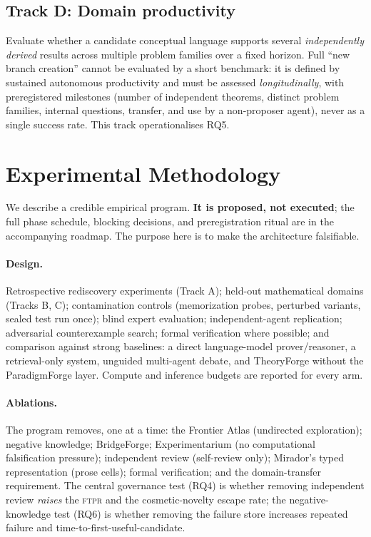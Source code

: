 \documentclass[11pt]{article}
\theoremstyle{definition}
\theoremstyle{remark}
\newcommand{\ftpr}{\textsc{ftpr}}
\newcommand{\PF}{ParadigmForge}
\begin{document}
\subsection{Track D: Domain productivity}
Evaluate whether a candidate conceptual language supports several \emph{independently derived}
results across multiple problem families over a fixed horizon. Full ``new branch creation'' cannot
be evaluated by a short benchmark: it is defined by sustained autonomous productivity and must be
assessed \emph{longitudinally}, with preregistered milestones (number of independent theorems,
distinct problem families, internal questions, transfer, and use by a non-proposer agent), never as
a single success rate. This track operationalises RQ5.

\section{Experimental Methodology}
\label{sec:method}

We describe a credible empirical program. \textbf{It is proposed, not executed}; the full phase
schedule, blocking decisions, and preregistration ritual are in the accompanying roadmap. The
purpose here is to make the architecture falsifiable.

\paragraph{Design.} Retrospective rediscovery experiments (Track A); held-out mathematical domains
(Tracks B, C); contamination controls (memorization probes, perturbed variants, sealed test run
once); blind expert evaluation; independent-agent replication; adversarial counterexample search;
formal verification where possible; and comparison against strong baselines: a direct language-model
prover/reasoner, a retrieval-only system, unguided multi-agent debate, and TheoryForge without the
\PF{} layer. Compute and inference budgets are reported for every arm.

\paragraph{Ablations.} The program removes, one at a time: the Frontier Atlas (undirected
exploration); negative knowledge; BridgeForge; Experimentarium (no computational falsification
pressure); independent review (self-review only); Mirador's typed representation (prose cells);
formal verification; and the domain-transfer requirement. The central governance test (RQ4) is
whether removing independent review \emph{raises} the \ftpr{} and the cosmetic-novelty escape rate;
the negative-knowledge test (RQ6) is whether removing the failure store increases repeated failure
and time-to-first-useful-candidate.
\end{document}
